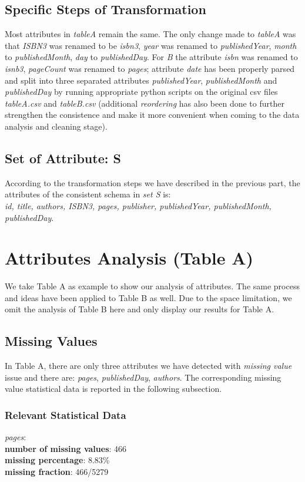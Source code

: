 \documentclass[10pt, oneside]{article}
\begin{document}
 \subsection*{Specific Steps of Transformation}
 Most attributes in \textit{tableA} remain the same. The only change made to \textit{tableA} was that \textit{ISBN3} was renamed to be \textit{isbn3},
 \textit{year} was renamed to \textit{publishedYear},  \textit{month} to \textit{publishedMonth}, \textit{day} to \textit{publishedDay}. For \textit{B}
 the attribute \textit{isbn} was renamed to \textit{isnb3}, \textit{pageCount} was renamed to \textit{pages}; attribute \textit{date} has been properly 
 parsed and split into three separated attributes \textit{publishedYear}, \textit{publishedMonth} and \textit{publishedDay} by running appropriate python scripts on the original csv files \textit{tableA.csv} 
 and \textit{tableB.csv} (additional \textit{reordering} has also been done to further strengthen the consistence and make it more convenient when coming to the data analysis and cleaning stage).
 
 \subsection*{Set of Attribute: S}
 According to the transformation steps we have described in the previous part, the attributes of the consistent schema in \textit{set S} is: \\
\textit{ id, title, authors, ISBN3, pages, publisher,  publishedYear, publishedMonth, publishedDay}.


\section*{Attributes Analysis (Table A)}
We take Table A as example to show our analysis of attributes. The same process and ideas have been applied to Table B as well. Due to the space limitation, we omit the analysis of 
Table B here and only display our results for Table A. 
\subsection*{Missing Values}
In Table A, there are only three attributes we have detected with \textit{missing value} issue and there are: \textit{pages}, \textit{publishedDay}, \textit{authors}. The corresponding 
missing value statistical data is reported in the following subsection.

\subsubsection*{Relevant Statistical Data}
\textit{pages}:\\ 
\textbf{number of missing values}: 466\\ 
\textbf{missing percentage}: 8.83\%\\ 
\textbf{missing fraction}: 466/5279 
\end{document}

